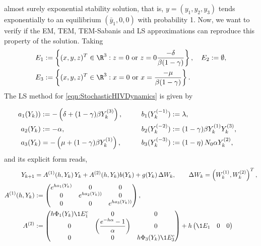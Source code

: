 \begin{example}
	almost surely exponential stability solution, that is,  $y=(y_1,y_2,y_3)$  tends 
	exponentially to an equilibrium $(\bar{y}_1,0,0)$ with probability 1. 
	Now, we want to verify if  the EM, TEM, TEM-Sabanis \cite{Sabanis2015} and LS approximations can reproduce this 
	property of the solution. Taking 
	\begin{align*}
		E_1&:=\left\{
			(x,y,z)^T \in \R^3:
			z=0 
			\text{ or }
			z=0
			\frac{-\delta}{\beta(1-\gamma)}
		\right\}, \quad
		E_2:=	\emptyset,   \\
		E_3&:=\left\{
			(x,y,z)^T \in \R^3: 
			x=0
			\text{ or }
			x=
			\frac{-\mu}{\beta(1-\gamma)}
		\right\}.
	\end{align*}
	The LS method for \eqref{eqn:StochasticHIVDynamics} is given by
	
	\begin{align}
		a_{1}(Y_k)) &:= 
		-\left(
		\delta + (1 - \gamma) \beta Y_k^{(3)}
		\right),		
		& b_1(Y_k^{(-1)}) &:= \lambda, 
		& 
		\notag
		\\
		a_{2}(Y_k) &:= -\alpha,
		&b_2(Y_k^{(-2)}) & :=
		(1-\gamma) \beta Y_{k}^{(1)} Y_{k}^{(3)},
		\notag
		\\
		a_{3}(Y_k) &= 
		-
		\left(
		\mu + (1- \gamma) \beta Y_{k}^{(1)}
		\right),
		\qquad
		&b_{3}(Y_k^{(-3)}) &:= 
		\left(
		1 - \eta 
		\right)
		N_0 \alpha Y_{k}^{(2)},
		\notag			
	\end{align}
	and its explicit form reads,
	\begin{align}
		Y_{k+1} &= A^{(1)}(h,Y_k) \,Y_k + A^{(2)}(h,Y_k)b(Y_k)+ g(Y_k)\, \Delta W_k,
		\qquad \Delta W_k = \left(W_k^{(1)}, W_k^{(2)}\right)^T, 
		\notag\\ 
		A^{(1)}(h,Y_k)&:=
		\begin{pmatrix}
			e^{ha_1(Y_k)}	&	0	&0 \\
			0	&e^{ha_2(Y_k))}	&0\\
			0	&0				&e^{ha_3(Y_k))}
		\end{pmatrix},
		\notag
		\\
		A^{(2)}&:=
		\begin{pmatrix}
			h \Phi_1(Y_k)\1{E_1^c}	&0	&0\\
			0 & 
			\left(\displaystyle
			\frac{e^{-h\alpha} - 1}{\alpha}
			\right) & 0\\
			0 & 0 & h \Phi_3(Y_k)\1{E_3^c} 
		\end{pmatrix}
		+h
		\begin{pmatrix}
			\1{E_1}	&0 			&0\\

\end{pmatrix}
\end{align}
\end{example}
